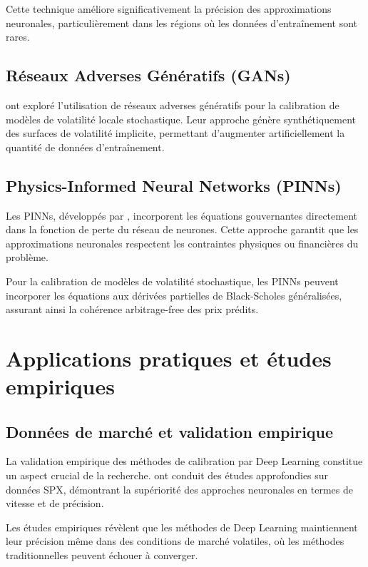 Cette technique améliore significativement la précision des approximations neuronales, particulièrement dans les régions où les données d'entraînement sont rares.

\subsection{Réseaux Adverses Génératifs (GANs)}

\citet{cuchiero2020generative} ont exploré l'utilisation de réseaux adverses génératifs pour la calibration de modèles de volatilité locale stochastique. Leur approche génère synthétiquement des surfaces de volatilité implicite, permettant d'augmenter artificiellement la quantité de données d'entraînement.

\subsection{Physics-Informed Neural Networks (PINNs)}

Les PINNs, développés par \citet{raissi2019physics}, incorporent les équations gouvernantes directement dans la fonction de perte du réseau de neurones. Cette approche garantit que les approximations neuronales respectent les contraintes physiques ou financières du problème.

Pour la calibration de modèles de volatilité stochastique, les PINNs peuvent incorporer les équations aux dérivées partielles de Black-Scholes généralisées, assurant ainsi la cohérence arbitrage-free des prix prédits.

\section{Applications pratiques et études empiriques}

\subsection{Données de marché et validation empirique}

La validation empirique des méthodes de calibration par Deep Learning constitue un aspect crucial de la recherche. \citet{horvath2021deep} ont conduit des études approfondies sur données SPX, démontrant la supériorité des approches neuronales en termes de vitesse et de précision.

Les études empiriques révèlent que les méthodes de Deep Learning maintiennent leur précision même dans des conditions de marché volatiles, où les méthodes traditionnelles peuvent échouer à converger.

